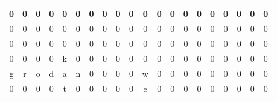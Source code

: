 \documentclass[a4paper]{article}
\begin{document}
{\begin{tabular}{|c|c|c|c|c|c|c|c|c|c|c|c|c|c|c|c|c|c|c|c|}
\cellcolor{black}0 & \cellcolor{black}0 & \cellcolor{black}0 & \cellcolor{black}0 & \cellcolor{black}0 & \cellcolor{black}0 & \cellcolor{black}0 & \cellcolor{black}0 & \cellcolor{black}0 & \cellcolor{black}0 & \cellcolor{black}0 & \cellcolor{black}0 & \cellcolor{black}0 & \cellcolor{black}0 & \cellcolor{black}0 & \cellcolor{black}0 & \cellcolor{black}0 & \cellcolor{black}0 & \cellcolor{black}0 & \cellcolor{black}0\\ \hline
\cellcolor{black}0 & \cellcolor{black}0 & \cellcolor{black}0 & \cellcolor{black}0 & \cellcolor{black}0 & \cellcolor{black}0 & \cellcolor{black}0 & \cellcolor{black}0 & \cellcolor{black}0 & \cellcolor{black}0 & \cellcolor{black}0 & \cellcolor{black}0 & \cellcolor{black}0 & \cellcolor{black}0 & \cellcolor{black}0 & \cellcolor{black}0 & \cellcolor{black}0 & \cellcolor{black}0 & \cellcolor{black}0 & \cellcolor{black}0\\ \hline
\cellcolor{black}0 & \cellcolor{black}0 & \cellcolor{black}0 & \cellcolor{black}0 & \cellcolor{black}0 & \cellcolor{black}0 & \cellcolor{black}0 & \cellcolor{black}0 & \cellcolor{black}0 & \cellcolor{black}0 & \cellcolor{black}0 & \cellcolor{black}0 & \cellcolor{black}0 & \cellcolor{black}0 & \cellcolor{black}0 & \cellcolor{black}0 & \cellcolor{black}0 & \cellcolor{black}0 & \cellcolor{black}0 & \cellcolor{black}0\\ \hline
\cellcolor{black}0 & \cellcolor{black}0 & \cellcolor{black}0 & \cellcolor{black}0 & k & \cellcolor{black}0 & \cellcolor{black}0 & \cellcolor{black}0 & \cellcolor{black}0 & \cellcolor{black}0 & \cellcolor{black}0 & \cellcolor{black}0 & \cellcolor{black}0 & \cellcolor{black}0 & \cellcolor{black}0 & \cellcolor{black}0 & \cellcolor{black}0 & \cellcolor{black}0 & \cellcolor{black}0 & \cellcolor{black}0\\ \hline
g & r & o & d & a & n & \cellcolor{black}0 & \cellcolor{black}0 & \cellcolor{black}0 & \cellcolor{black}0 & w & \cellcolor{black}0 & \cellcolor{black}0 & \cellcolor{black}0 & \cellcolor{black}0 & \cellcolor{black}0 & \cellcolor{black}0 & \cellcolor{black}0 & \cellcolor{black}0 & \cellcolor{black}0\\ \hline
\cellcolor{black}0 & \cellcolor{black}0 & \cellcolor{black}0 & \cellcolor{black}0 & t & \cellcolor{black}0 & \cellcolor{black}0 & \cellcolor{black}0 & \cellcolor{black}0 & \cellcolor{black}0 & e & \cellcolor{black}0 & \cellcolor{black}0 & \cellcolor{black}0 & \cellcolor{black}0 & \cellcolor{black}0 & \cellcolor{black}0 & \cellcolor{black}0 & \cellcolor{black}0 & \cellcolor{black}0\\ \hline

\end{tabular}}
\end{document}
